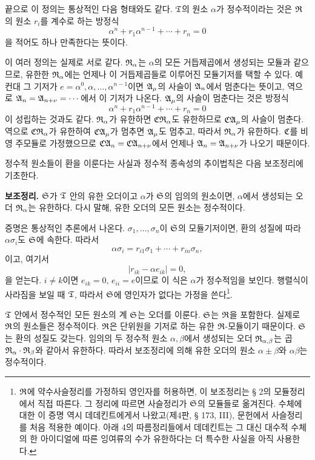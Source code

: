 끝으로 이 정의는 통상적인 다음 형태와도 같다. \(\mathfrak{T}\)의 원소 \(\alpha\)가 정수적이라는 것은 \(\mathfrak{R}\)의 원소 \(r_i\)를 계수로 하는 방정식
\[
        \alpha^n+r_1\alpha^{n-1}+\cdots+r_n=0
\]
을 적어도 하나 만족한다는 뜻이다.

이 여러 정의는 실제로 서로 같다. \(\mathfrak{R}_\alpha\)는 \(\alpha\)의 모든 거듭제곱에서 생성되는 모듈과 같으므로, 유한한 \(\mathfrak{R}_\alpha\)에는 언제나 이 거듭제곱들로 이루어진 모듈기저를 택할 수 있다. 예컨대 그 기저가 \(e=\alpha^0,\alpha,\ldots,\alpha^{n-1}\)이면 \(\mathfrak A_\mu\)의 사슬이 \(\mathfrak A_n\)에서 멈춘다는 뜻이고, 역으로 \(\mathfrak A_n=\mathfrak A_{n+\nu}=\cdots\)에서 이 기저가 나온다. \(\mathfrak A_\mu\)의 사슬이 멈춘다는 것은 방정식
\[
        \alpha^n+r_1\alpha^{n-1}+\cdots+r_n=0
\]
이 성립하는 것과도 같다. \(\mathfrak{R}_\alpha\)가 유한하면 \(\mathfrak{C}\mathfrak{R}_\alpha\)도 유한하므로 \(\mathfrak{C}\mathfrak A_\mu\)의 사슬이 멈춘다. 역으로 \(\mathfrak{C}\mathfrak{R}_\alpha\)가 유한하여 \(\mathfrak{C}\mathfrak A_\mu\)가 멈추면 \(\mathfrak A_\mu\)도 멈추고, 따라서 \(\mathfrak{R}_\alpha\)가 유한하다. \(\mathfrak{C}\)를 비영 주모듈로 가정했으므로 \(\mathfrak{C}\mathfrak A_n=\mathfrak{C}\mathfrak A_{n+\nu}\)에서 언제나 \(\mathfrak A_n=\mathfrak A_{n+\nu}\)가 나오기 때문이다.

정수적 원소들이 환을 이룬다는 사실과 정수적 종속성의 추이법칙은 다음 보조정리에 기초한다.

\medskip
\noindent\textbf{보조정리.} \(\mathfrak S\)가 \(\mathfrak{T}\) 안의 유한 오더이고 \(\alpha\)가 \(\mathfrak S\)의 임의의 원소이면, \(\alpha\)에서 생성되는 오더 \(\mathfrak{R}_\alpha\)는 유한하다. 다시 말해, 유한 오더의 모든 원소는 정수적이다.

증명은 통상적인 추론에서 나온다. \(\sigma_1,\ldots,\sigma_n\)이 \(\mathfrak S\)의 모듈기저이면, 환의 성질에 따라 \(\alpha\sigma_i\)도 \(\mathfrak S\)에 속한다. 따라서
\[
        \alpha\sigma_i=r_{i1}\sigma_1+\cdots+r_{in}\sigma_n,
\]
이고, 여기서
\[
        \left|r_{ik}-\alpha e_{ik}\right|=0,
\]
을 얻는다. \(i\ne k\)이면 \(e_{ik}=0\), \(e_{ii}=e\)이므로 이 식은 \(\alpha\)가 정수적임을 보인다. 행렬식이 사라짐을 보일 때 \(\mathfrak{T}\), 따라서 \(\mathfrak S\)에 영인자가 없다는 가정을 쓴다\footnote{\(\mathfrak{R}\)에 약수사슬정리를 가정하되 영인자를 허용하면, 이 보조정리는 § 2의 모듈정리에서 직접 따른다. 그 정리에 따르면 사슬정리가 \(\mathfrak S\)의 모듈들로 옮겨진다. 수체에 대한 이 증명 역시 데데킨트에게서 나왔고(제4판, § 173, III), 문헌에서 사슬정리를 처음 적용한 예이다. 아래 4의 따름정리들에서 데데킨트는 그 대신 대수적 수체의 한 아이디얼에 따른 잉여류의 수가 유한하다는 더 특수한 사실을 아직 사용한다.}.

\(\mathfrak{T}\) 안에서 정수적인 모든 원소의 계 \(\mathfrak S\)는 오더를 이룬다. \(\mathfrak S\)는 \(\mathfrak{R}\)을 포함한다. 실제로 \(\mathfrak{R}\)의 원소들은 정수적이다. \(\mathfrak{R}\)은 단위원을 기저로 하는 유한 \(\mathfrak{R}\)-모듈이기 때문이다. \(\mathfrak S\)는 환의 성질도 갖는다. 임의의 두 정수적 원소 \(\alpha,\beta\)에서 생성되는 오더 \(\mathfrak{R}_{\alpha,\beta}\)는 곱 \(\mathfrak{R}_\alpha\cdot\mathfrak{R}_\beta\)와 같아서 유한하다. 따라서 보조정리에 의해 유한 오더의 원소 \(\alpha\pm\beta\)와 \(\alpha\beta\)는 정수적이다.

